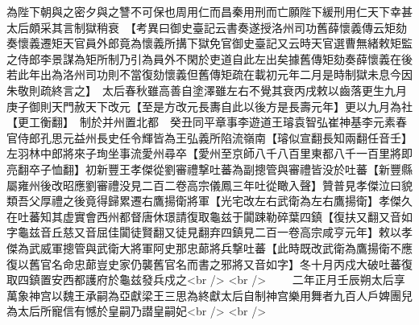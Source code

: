 為陛下朝與之密夕與之讐不可保也周用仁而昌秦用刑而亡願陛下緩刑用仁天下幸甚太后頗采其言制獄稍衰　【考異曰御史臺記云書奏遂授洛州司功舊薛懷義傳云矩劾奏懷義遷矩天官員外郎竟為懷義所搆下獄免官御史臺記又云時天官選曹無緒敕矩監之侍郎李景謀為矩所制乃引為員外不閑於吏道自此左出矣據舊傳矩劾奏薛懷義在後若此年出為洛州司功則不當復劾懷義但舊傳矩疏在載初元年二月是時制獄未息今因朱敬則疏終言之】　太后春秋雖高善自塗澤雖左右不覺其衰丙戌敕以齒落更生九月庚子御則天門赦天下改元【至是方改元長夀自此以後方是長壽元年】更以九月為社【更工衡翻】　制於并州置北都　癸丑同平章事李遊道王璿袁智弘崔神基李元素春官侍郎孔思元益州長史任令輝皆為王弘義所陷流嶺南【璿似宣翻長知兩翻任音壬】　左羽林中郎將來子珣坐事流愛州尋卒【愛州至京師八千八百里東都八千一百里將即亮翻卒子恤翻】初新豐王孝傑從劉審禮撃吐蕃為副摠管與審禮皆没於吐蕃【新豐縣屬雍州後改昭應劉審禮没見二百二卷高宗儀鳳三年吐從瞰入聲】贊普見孝傑泣曰貌類吾父厚禮之後竟得歸累遷右鷹揚衛將軍【光宅改左右武衛為左右鷹揚衛】孝傑久在吐蕃知其虚實會西州都督唐休璟請復取龜兹于闐踈勒碎葉四鎮【復扶又翻又音如字龜兹音丘慈又音屈佳闐徒賢翻又徒見翻弃四鎮見二百一卷高宗咸亨元年】敕以孝傑為武威軍摠管與武衛大將軍阿史那忠蓈將兵撃吐蕃【此時既改武衛為鷹揚衛不應復以舊官名命忠蓈豈史家仍襲舊官名而書之邪將又音如字】冬十月丙戍大破吐蕃復取四鎮置安西都護府於龜兹發兵戍之<br />
<br />
　　二年正月壬辰朔太后享萬象神宫以魏王承嗣為亞獻梁王三思為終獻太后自制神宫樂用舞者九百人戶婢團兒為太后所寵信有憾於皇嗣乃譛皇嗣妃<br />
<br />
